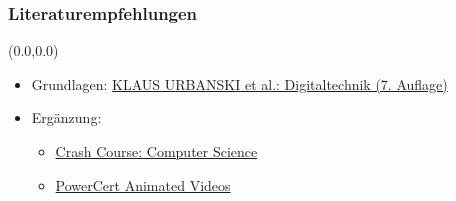 \documentclass[aspectratio=169, 14pt]{beamer}
\begin{document}
\begin{frame}
    \frametitle{Literaturempfehlungen}
    \begin{textblock*}{2\paperwidth}(0.0\paperwidth,0.0\paperheight)
        \vspace*{2.0cm}
        \begin{itemize}
            \setlength\itemsep{16pt}
            \item Grundlagen: \textcolor{uniblau}{\href{https://link.springer.com/book/10.1007/978-3-662-49731-9}{K{\fontsize{10}{10}\selectfont LAUS} U{\fontsize{10}{10}\selectfont RBANSKI} et al.: Digitaltechnik (7. Auflage)}}
            \item Ergänzung:
                \vspace*{-\parskip}
                \begin{itemize}
                \item \textcolor{uniblau}{\href{https://www.youtube.com/playlist?list=PLH2l6uzC4UEW0s7-KewFLBC1D0l6XRfye}{Crash Course: Computer Science}}
                \item \textcolor{uniblau}{\href{https://www.youtube.com/channel/UCJQJ4GjTiq5lmn8czf8oo0Q}{PowerCert Animated Videos}}
                \end{itemize}
        \end{itemize}
    \end{textblock*}
    \framenumber
\end{frame}
\end{document}
